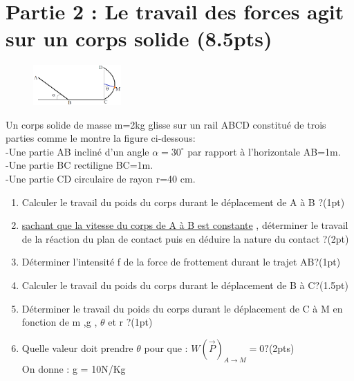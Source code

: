 \documentclass[12pt]{article}
\begin{document}

\section*{Partie 2 : Le travail des forces agit sur un corps solide (8.5pts)}
\begin{figure}
  \begin{center}
    \includegraphics[width=0.3\textwidth]{./img/imgf01.png}
  \end{center}
\end{figure}


Un corps solide de masse m=2kg glisse sur un rail ABCD constitué de trois parties comme le montre la figure ci-dessous:
\\-Une partie AB incliné d’un angle $\alpha = 30^{\circ}$ par rapport à l’horizontale AB=1m.
\\-Une partie BC rectiligne BC=1m.
\\-Une partie CD circulaire de rayon r=40 cm.
\begin{enumerate}
    \item Calculer le travail du poids du corps durant le déplacement de A à B ?(1pt)
    \item \underline{sachant que la vitesse du corps de A  à B est constante} , déterminer le travail de la réaction du plan de contact puis en déduire la nature du contact ?\dotfill(2pt)
        \item Déterminer l’intensité f de la force de frottement durant le trajet AB?\dotfill(1pt)
        \item Calculer le travail du poids du corps durant le déplacement de B à C?\dotfill(1.5pt)
        \item Déterminer le travail du poids du corps durant le déplacement de C à M en fonction de m ,g , $\theta$ et r ?\dotfill(1pt)
        \item Quelle valeur doit prendre $\theta$ pour que : $W(\vec{P})_{A{\rightarrow}M} = 0 ?$\dotfill(2pts)
            \\On donne : g = 10N/Kg
\end{enumerate}
\end{document}
